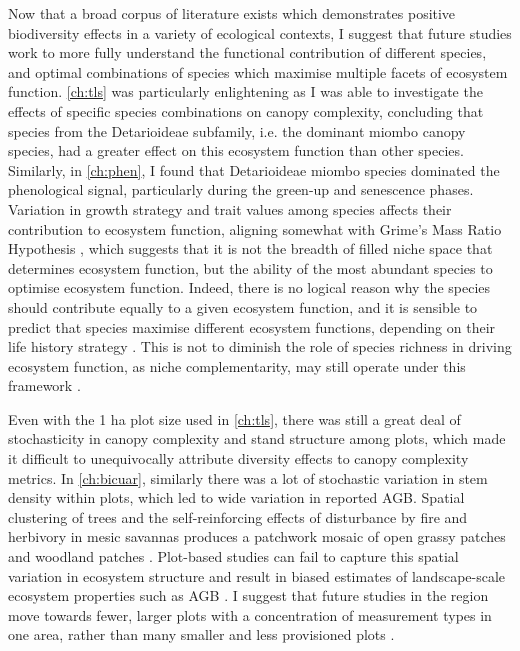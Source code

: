 \begin{refsection}
Now that a broad corpus of literature exists which demonstrates positive biodiversity effects in a variety of ecological contexts, I suggest that future studies work to more fully understand the functional contribution of different species, and optimal combinations of species which maximise multiple facets of ecosystem function. \autoref{ch:tls} was particularly enlightening as I was able to investigate the effects of specific species combinations on canopy complexity, concluding that species from the Detarioideae subfamily, i.e. the dominant miombo canopy species, had a greater effect on this ecosystem function than other species. Similarly, in \autoref{ch:phen}, I found that Detarioideae miombo species dominated the phenological signal, particularly during the green-up and senescence phases. Variation in growth strategy and trait values among species affects their contribution to ecosystem function, aligning somewhat with Grime's Mass Ratio Hypothesis \citep{Grime1998}, which suggests that it is not the breadth of filled niche space that determines ecosystem function, but the ability of the most abundant species to optimise ecosystem function. Indeed, there is no logical reason why the species should contribute equally to a given ecosystem function, and it is sensible to predict that species maximise different ecosystem functions, depending on their life history strategy \citep{}. This is not to diminish the role of species richness in driving ecosystem function, as niche complementarity, may still operate under this framework \citep{}.

Even with the 1 ha plot size used in \autoref{ch:tls}, there was still a great deal of stochasticity in canopy complexity and stand structure among plots, which made it difficult to unequivocally attribute diversity effects to canopy complexity metrics. In \autoref{ch:bicuar}, similarly there was a lot of stochastic variation in stem density within plots, which led to wide variation in reported AGB. Spatial clustering of trees and the self-reinforcing effects of disturbance by fire and herbivory in mesic savannas produces a patchwork mosaic of open grassy patches and woodland patches \citep{}. Plot-based studies can fail to capture this spatial variation in ecosystem structure and result in biased estimates of landscape-scale ecosystem properties such as AGB \citep{}. I suggest that future studies in the region move towards fewer, larger plots with a concentration of measurement types in one area, rather than many smaller and less provisioned plots \citep{}. 


\end{refsection}

